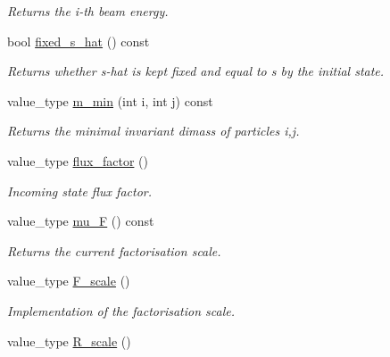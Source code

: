 \begin{DoxyCompactItemize}
\begin{DoxyCompactList}\small\item\em Returns the i-\/th beam energy. \end{DoxyCompactList}\item 
bool \hyperlink{a00441_a4f9919668827c6de2cf110abdf7a7301}{fixed\-\_\-s\-\_\-hat} () const 
\begin{DoxyCompactList}\small\item\em Returns whether s-\/hat is kept fixed and equal to s by the initial state. \end{DoxyCompactList}\item 
\hypertarget{a00441_ab974219877f95adf4f0dbeb9dbb3615e}{value\-\_\-type \hyperlink{a00441_ab974219877f95adf4f0dbeb9dbb3615e}{m\-\_\-min} (int i, int j) const }\label{a00441_ab974219877f95adf4f0dbeb9dbb3615e}

\begin{DoxyCompactList}\small\item\em Returns the minimal invariant dimass of particles i,j. \end{DoxyCompactList}\item 
\hypertarget{a00441_af4e5ffb99e4c314864782c45b591f51f}{value\-\_\-type \hyperlink{a00441_af4e5ffb99e4c314864782c45b591f51f}{flux\-\_\-factor} ()}\label{a00441_af4e5ffb99e4c314864782c45b591f51f}

\begin{DoxyCompactList}\small\item\em Incoming state flux factor. \end{DoxyCompactList}\item 
\hypertarget{a00441_a0335e9bf3b57266a267c39afd9194ce4}{value\-\_\-type \hyperlink{a00441_a0335e9bf3b57266a267c39afd9194ce4}{mu\-\_\-\-F} () const }\label{a00441_a0335e9bf3b57266a267c39afd9194ce4}

\begin{DoxyCompactList}\small\item\em Returns the current factorisation scale. \end{DoxyCompactList}\item 
\hypertarget{a00441_a551146c1e75b1394b261d0f6bfe70420}{value\-\_\-type \hyperlink{a00441_a551146c1e75b1394b261d0f6bfe70420}{F\-\_\-scale} ()}\label{a00441_a551146c1e75b1394b261d0f6bfe70420}

\begin{DoxyCompactList}\small\item\em Implementation of the factorisation scale. \end{DoxyCompactList}\item 
\hypertarget{a00441_a8bc81e1eb240d91126e08566a5a7353b}{value\-\_\-type \hyperlink{a00441_a8bc81e1eb240d91126e08566a5a7353b}{R\-\_\-scale} ()}\label{a00441_a8bc81e1eb240d91126e08566a5a7353b}


\end{DoxyCompactItemize}

